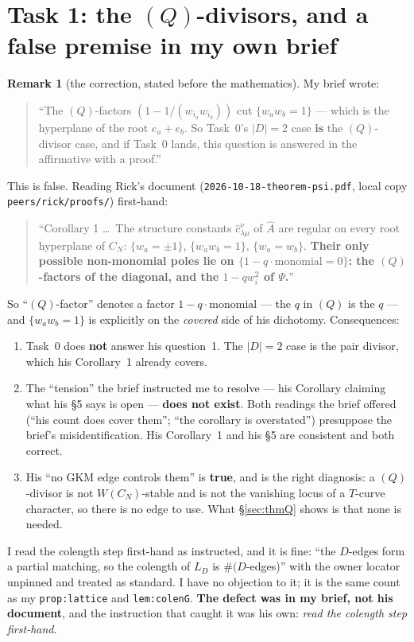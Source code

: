 \documentclass[11pt]{article}
\theoremstyle{definition}
\newtheorem{rem}[thm]{Remark}
\newcommand{\Ah}{\widehat{A}}
\begin{document}
\section{Task 1: the \texorpdfstring{$(Q)$}{(Q)}-divisors, and a false premise in my own brief}
\label{sec:task1}

\begin{rem}[the correction, stated before the mathematics]\label{rem:briefwrong}
My brief wrote:
\begin{quote}\small
``The $(Q)$-factors $(1-1/(w_{i_a}w_{i_b}))$ cut $\{w_aw_b=1\}$ --- which is the
hyperplane of the root $e_a+e_b$.  So Task~0's $|D|=2$ case \textbf{is} the
$(Q)$-divisor case, and if Task~0 lands, this question is answered in the
affirmative with a proof.''
\end{quote}
This is false.  Reading Rick's document (\texttt{2026-10-18-theorem-psi.pdf},
local copy \texttt{peers/rick/proofs/}) first-hand:
\begin{quote}\small
``Corollary 1 \ldots\ The structure constants $\hat c^{\nu}_{\lambda\mu}$ of
$\Ah$ are regular on every root hyperplane of $C_N$: $\{w_a=\pm1\}$,
$\{w_aw_b=1\}$, $\{w_a=w_b\}$.  \textbf{Their only possible non-monomial poles
lie on $\{1-q\cdot\text{monomial}=0\}$: the $(Q)$-factors of the diagonal, and
the $1-qw_i^{2}$ of $\Psi$.}''
\end{quote}
So ``$(Q)$-factor'' denotes a factor $1-q\cdot\text{monomial}$ --- the $q$ in
$(Q)$ is the $q$ --- and $\{w_aw_b=1\}$ is explicitly on the \emph{covered} side
of his dichotomy.  Consequences:
\begin{enumerate}
\item Task~0 does \textbf{not} answer his question~1.  The $|D|=2$ case is the
  pair divisor, which his Corollary~1 already covers.
\item The ``tension'' the brief instructed me to resolve --- his Corollary
  claiming what his \S5 says is open --- \textbf{does not exist}.  Both readings
  the brief offered (``his count does cover them''; ``the corollary is
  overstated'') presuppose the brief's misidentification.  His Corollary~1 and
  his \S5 are consistent and both correct.
\item His ``no GKM edge controls them'' is \textbf{true}, and is the right
  diagnosis: a $(Q)$-divisor is not $W(C_N)$-stable and is not the vanishing locus
  of a $T$-curve character, so there is no edge to use.  What
  \S\ref{sec:thmQ} shows is that none is needed.
\end{enumerate}
I read the colength step first-hand as instructed, and it is fine: ``the
$D$-edges form a partial matching, so the colength of $L_D$ is $\#(D$-edges)''
with the owner locator unpinned and treated as standard.  I have no objection to
it; it is the same count as my \texttt{prop:lattice} and \texttt{lem:colenG}.
\textbf{The defect was in my brief, not his document}, and the instruction that
caught it was his own: \emph{read the colength step first-hand}.
\end{rem}
\end{document}
